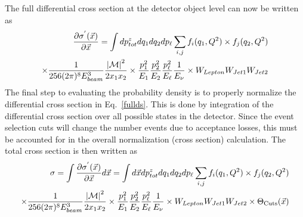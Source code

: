 The full differential cross section at the detector object level can
now be written as
\begin{eqnarray}
\label{fullds}
\nonumber
\frac{\partial \sigma^{'}(\vec{x})}{\partial \vec{x}} =
\int dp^{z}_{tot}dq_{1}dq_{2}dp_{\ell} \sum_{i,j}
f_{i}(q_{1}, Q^{2}) \times f_{j}(q_{2}, Q^{2}) \\
\times \frac{1}{256(2\pi)^{8}E^{3}_{beam}}
\frac{{|\cal M|}^{2}}{2x_{1}x_{2}} \times
\frac{p_{1}^{2}}{E_{1}} \frac{p_{2}^{2}}{E_{2}} 
\frac{p_{\ell}^{2}}{E_{\ell}} \frac{1}{E_{\nu}}
\times W_{Lepton}W_{Jet1}W_{Jet2}
\end{eqnarray}
\noindent The final step to evaluating the probability density is to
properly normalize the differential cross section in
Eq.~\ref{fullds}. This is done by integration of the differential
cross section over all possible states in the detector. Since the
event selection cuts will change the number events due to acceptance
losses, this must be accounted for in the overall normalization (cross
section) calculation. The total cross section is then written as
\begin{eqnarray}
\label{norm}
\nonumber
\sigma = \int \frac{\partial \sigma^{'}(\vec{x})}{\partial \vec{x}} d\vec{x} =
\int d\vec{x}dp^{z}_{tot}dq_{1}dq_{2}dp_{\ell} \sum_{i,j}
f_{i}(q_{1}, Q^{2}) \times f_{j}(q_{2}, Q^{2}) \\
\times \frac{1}{256(2\pi)^{8}E^{3}_{beam}}
\frac{{|\cal M|}^{2}}{2x_{1}x_{2}} \times
\frac{p_{1}^{2}}{E_{1}} \frac{p_{2}^{2}}{E_{2}} 
\frac{p_{\ell}^{2}}{E_{\ell}} \frac{1}{E_{\nu}}
\times W_{Lepton}W_{Jet1}W_{Jet2} \times \Theta_{\rm{Cuts}}(\vec{x})
\end{eqnarray}

